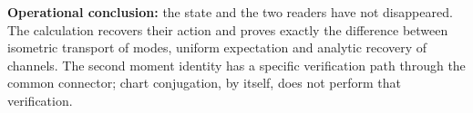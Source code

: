 \textbf{Operational conclusion:} the state and the two readers have not disappeared. The calculation recovers their action and proves exactly the difference between isometric transport of modes, uniform expectation and analytic recovery of channels. The second moment identity has a specific verification path through the common connector; chart conjugation, by itself, does not perform that verification.
